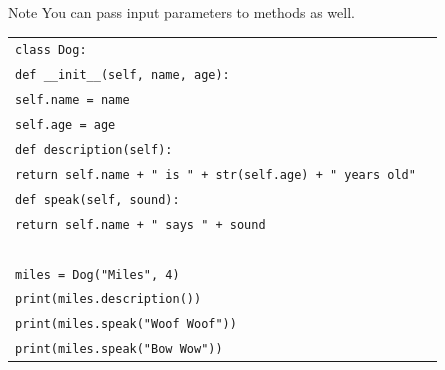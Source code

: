 \documentclass[t,handout,9pt]{beamer}
\begin{document}
\begin{frame}
\vfill
\begin{block}{Note}
You can pass input parameters to methods as well.
\end{block}
\begin{table}[]
\begin{flushleft}
\begin{tabular}{ll}
\texttt{class Dog:} &  \\
\texttt{\qquad def \_\_init\_\_(self, name, age):} &  \\
\texttt{\qquad\qquad self.name = name} &  \\
\texttt{\qquad\qquad self.age = age} &  \\
\texttt{\qquad def description(self):} &  \\
\texttt{\qquad\qquad return self.name + " is " + str(self.age) + " years old"} &  \\
\texttt{\qquad def speak(self, sound):} &  \\
\texttt{\qquad\qquad return self.name + " says " + sound} &  \\
\texttt{ } &  \\
\texttt{miles = Dog("Miles", 4)} &  \\
\texttt{print(miles.description())} &  \\
\texttt{print(miles.speak("Woof Woof"))} &  \\
\texttt{print(miles.speak("Bow Wow"))} &  \\
\end{tabular}
\end{flushleft}
\end{table}
\vfill
\end{frame}
\end{document}
